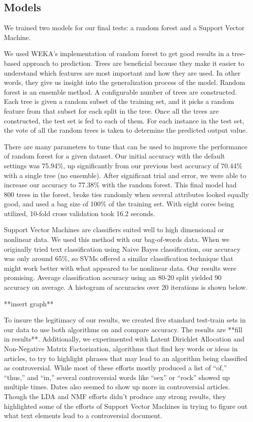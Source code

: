 \documentclass{article}
\begin{document}
\subsection{Models}

We trained two models for our final tests: a random forest and a Support Vector Machine.

We used WEKA’s implementation of random forest to get good results in a tree-based approach to prediction. 
Trees are beneficial because they make it easier to understand which features are most important and how they are used. 
In other words, they give us insight into the generalization process of the model. Random forest is an ensemble method. 
A configurable number of trees are constructed.
Each tree is given a random subset of the training set, and it picks a random feature from that subset for each split in the tree. 
Once all the trees are constructed, the test set is fed to each of them. 
For each instance in the test set, the vote of all the random trees is taken to determine the predicted output value.

There are many parameters to tune that can be used to improve the performance of random forest for a given dataset.
Our initial accuracy with the default settings was 75.94\%, up significantly from our previous best accuracy of 70.44\% with a single tree (no ensemble). 
After significant trial and error, we were able to increase our accuracy to 77.38\% with the random forest. 
This final model had 800 trees in the forest, broke ties randomly when several attributes looked equally good, and used a bag size of 100\% of the training set. With eight cores being utilized, 10-fold cross validation took 16.2 seconds.

Support Vector Machines are classifiers suited well to high dimensional or nonlinear data.
We used this method with our bag-of-words data. When we originally tried text classification using Naive Bayes classification, our accuracy was only around 65\%, so SVMs offered a similar classification technique that might work better with what appeared to be nonlinear data. 
Our results were promising. Average classification accuracy using an 80-20 split yielded 90 accuracy on average. 
A histogram of accuracies over 20 iterations is shown below.

**insert graph**

To insure the legitimacy of our results, we created five standard test-train sets in our data to use both algorithms on and compare accuracy. 
The results are **fill in results**. 
Additionally, we experimented with Latent Dirichlet Allocation and Non-Negative Matrix Factorization, algorithms that find key words or ideas in articles, to try to highlight phrases that may lead to an algorithm being classified as controversial. 
While most of these efforts mostly produced a list of “of,” “thus,” and “in,” several controversial words like “sex” or “rock” showed up multiple times. 
Dates also seemed to show up more in controversial articles. 
Though the LDA and NMF efforts didn’t produce any strong results, they highlighted some of the efforts of Support Vector Machines in trying to figure out what text elements lead to a controversial document.
\end{document}
